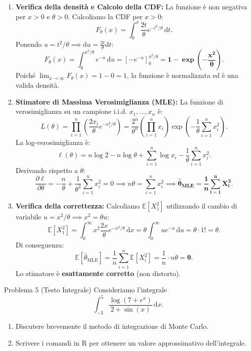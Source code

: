 \documentclass[11pt,a4paper]{article}
\newcommand{\EE}{\mathbb{E}}
\newcommand{\dx}{\mathrm{d}x}
\begin{document}
\begin{soluzionebox}
\begin{enumerate}[label=(\alph*)]
    \item \textbf{Verifica della densità e Calcolo della CDF:}
    La funzione è non negativa per $x > 0$ e $\theta > 0$. Calcoliamo la CDF per $x > 0$:
    \[
    F_\theta(x) = \int_0^x \frac{2t}{\theta} e^{-t^2/\theta} \, \mathrm{d}t.
    \]
    Ponendo $u = t^2/\theta \implies \mathrm{d}u = \frac{2t}{\theta}\mathrm{d}t$:
    \[
    F_\theta(x) = \int_0^{x^2/\theta} e^{-u} \, \mathrm{d}u = \left[ -e^{-u} \right]_0^{x^2/\theta} = \mathbf{1 - \exp\left(-\frac{x^2}{\theta}\right)}.
    \]
    Poiché $\lim_{x \to \infty} F_\theta(x) = 1 - 0 = 1$, la funzione è normalizzata ed è una valida densità.

    \item \textbf{Stimatore di Massima Verosimiglianza (MLE):}
    La funzione di verosimiglianza su un campione i.i.d. $x_1, \dots, x_n$ è:
    \[
    L(\theta) = \prod_{i=1}^n \left( \frac{2x_i}{\theta} e^{-x_i^2/\theta} \right) = \frac{2^n}{\theta^n} \left(\prod_{i=1}^n x_i\right) \exp\left( -\frac{1}{\theta} \sum_{i=1}^n x_i^2 \right).
    \]
    La log-verosimiglianza è:
    \[
    \ell(\theta) = n \log 2 - n \log \theta + \sum_{i=1}^n \log x_i - \frac{1}{\theta}\sum_{i=1}^n x_i^2.
    \]
    Derivando rispetto a $\theta$:
    \[
    \frac{\partial \ell}{\partial \theta} = -\frac{n}{\theta} + \frac{1}{\theta^2}\sum_{i=1}^n x_i^2 = 0 \implies n\theta = \sum_{i=1}^n x_i^2 \implies \mathbf{\widehat{\theta}_{\text{MLE}} = \frac{1}{n}\sum_{i=1}^n X_i^2}.
    \]

    \item \textbf{Verifica della correttezza:}
    Calcoliamo $\EE[X_1^2]$ utilizzando il cambio di variabile $u = x^2/\theta \implies x^2 = \theta u$:
    \[
    \EE[X_1^2] = \int_0^\infty x^2 \frac{2x}{\theta} e^{-x^2/\theta} \, \dx = \theta \int_0^\infty u e^{-u} \, \mathrm{d}u = \theta \cdot 1! = \theta.
    \]
    Di conseguenza:
    \[
    \EE[\widehat{\theta}_{\text{MLE}}] = \frac{1}{n}\sum_{i=1}^n \EE[X_i^2] = \frac{1}{n} \cdot n \theta = \mathbf{\theta}.
    \]
    Lo stimatore è \textbf{esattamente corretto} (non distorto).
\end{enumerate}
\end{soluzionebox}

\begin{problemabox}{Problema 5 (Testo Integrale)}
Consideriamo l'integrale
\[
\int_{-3}^5 \frac{\log(7 + e^x)}{2 + \sin(x)} \, \dx.
\]
\begin{enumerate}[label=(\alph*)]
    \item Discutere brevemente il metodo di integrazione di Monte Carlo.
    \item Scrivere i comandi in R per ottenere un valore approssimativo dell'integrale.
\end{enumerate}
\end{problemabox}
\end{document}
